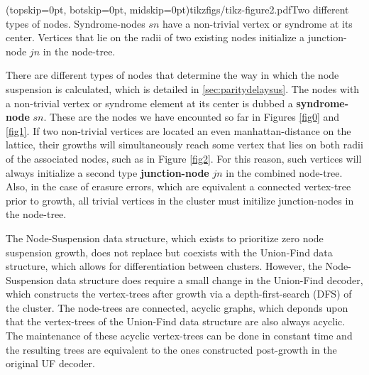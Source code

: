\Figure[htb](topskip=0pt, botskip=0pt, midskip=0pt){tikzfigs/tikz-figure2.pdf}{Two different types of nodes. Syndrome-nodes $sn$ have a non-trivial vertex or syndrome at its center. Vertices that lie on the radii of two existing nodes initialize a junction-node $jn$ in the node-tree.\label{fig2}}

There are different types of nodes that determine the way in which the node suspension is calculated, which is detailed in \ref{sec:paritydelaysus}. The nodes with a non-trivial vertex or syndrome element at its center is dubbed a \textbf{syndrome-node} $sn$. These are the nodes we have encounted so far in Figures \ref{fig0} and \ref{fig1}. If two non-trivial vertices are located an even manhattan-distance on the lattice, their growths will simultaneously reach some vertex that lies on both radii of the associated nodes, such as in Figure \ref{fig2}. For this reason, such vertices will always initialize a second type \textbf{junction-node} $jn$ in the combined node-tree. Also, in the case of erasure errors, which are equivalent a connected vertex-tree prior to growth, all trivial vertices in the cluster must initilize junction-nodes in the node-tree.

The Node-Suspension data structure, which exists to prioritize zero node suspension growth, does not replace but coexists with the Union-Find data structure, which allows for differentiation between clusters. However, the Node-Suspension data structure does require a small change in the Union-Find decoder, which constructs the vertex-trees after growth via a depth-first-search (DFS) of the cluster. The node-trees are connected, acyclic graphs, which deponds upon that the vertex-trees of the Union-Find data structure are also always acyclic. The maintenance of these acyclic vertex-trees can be done in constant time and the resulting trees are equivalent to the ones constructed post-growth in the original UF decoder. 
